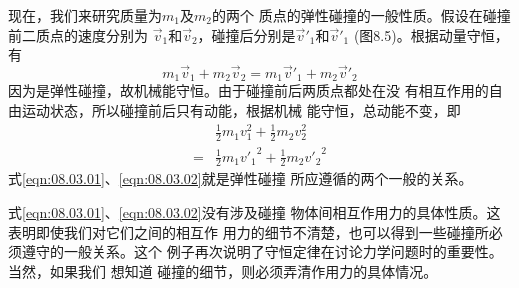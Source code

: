 现在，我们来研究质量为$ m _ { 1 } $及$ m _ { 2 } $的两个
质点的弹性碰撞的一般性质。假设在碰撞前二质点的速度分别为
$ \vec{ v } _ { 1 } $和$ \vec{ v } _ { 2 } $，碰撞后分别是$ \vec{ v } ' _ { 1 } $和$ \vec{ v } ' _ { 1 } $
(图8.5)。根据动量守恒，有
\begin{equation}\label{eqn:08.03.01}
  m _ { 1 } \vec{ v } _ { 1 } + m _ { 2 } \vec{ v } _ { 2 } = m _ { 1 } \vec{ v } ' _ { 1 } + m _ { 2 } \vec{ v } ' _ { 2 }
\end{equation}
因为是弹性碰撞，故机械能守恒。由于碰撞前后两质点都处在没
有相互作用的自由运动状态，所以碰撞前后只有动能，根据机械
能守恒，总动能不变，即
\begin{equation}\label{eqn:08.03.02}
  \begin{split}
    & \frac { 1 } { 2 } m _ { 1 } v _ { 1 } ^ { 2 } + \frac { 1 } { 2 } m _ { 2 } v _ { 2 } ^ { 2 } \\
    = & \frac { 1 } { 2 } m _ { 1 } { v ' _ { 1 } } ^ { 2 } + \frac { 1 } { 2 } m _ { 2 } { v ' _ { 2 } } ^ { 2 }
  \end{split}
\end{equation}
式\eqref{eqn:08.03.01}、\eqref{eqn:08.03.02}就是弹性碰撞
所应遵循的两个一般的关系。

式\eqref{eqn:08.03.01}、\eqref{eqn:08.03.02}没有涉及碰撞
物体间相互作用力的具体性质。这表明即使我们对它们之间的相互作
用力的细节不清楚，也可以得到一些碰撞所必须遵守的一般关系。这个
例子再次说明了守恒定律在讨论力学问题时的重要性。当然，如果我们
想知道
碰撞的细节，则必须弄清作用力的具体情况。

